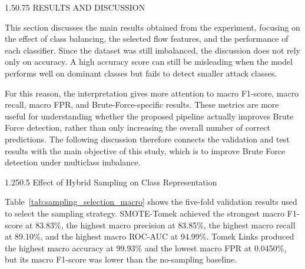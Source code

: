 \documentclass[12pt,a4paper]{article}
\makeatletter
\renewcommand{\section}{\@startsection{section}{1}{0pt}%
  {1.5\baselineskip}{0.75\baselineskip}%
  {\normalfont\fontsize{13}{15.6}\selectfont\bfseries}}
\renewcommand{\subsection}{\@startsection{subsection}{2}{0pt}%
  {1.25\baselineskip}{0.5\baselineskip}%
  {\normalfont\fontsize{13}{15.6}\selectfont\bfseries}}
\makeatother
\begin{document}
\FloatBarrier

\section{RESULTS AND DISCUSSION}

This section discusses the main results obtained from the experiment, focusing on the effect of class balancing, the selected flow features, and the performance of each classifier. Since the dataset was still imbalanced, the discussion does not rely only on accuracy. A high accuracy score can still be misleading when the model performs well on dominant classes but fails to detect smaller attack classes.

For this reason, the interpretation gives more attention to macro F1-score, macro recall, macro FPR, and Brute-Force-specific results. These metrics are more useful for understanding whether the proposed pipeline actually improves Brute Force detection, rather than only increasing the overall number of correct predictions. The following discussion therefore connects the validation and test results with the main objective of this study, which is to improve Brute Force detection under multiclass imbalance.

\subsection{Effect of Hybrid Sampling on Class Representation}

Table~\ref{tab:sampling_selection_macro} shows the five-fold validation results used to select the sampling strategy. SMOTE-Tomek achieved the strongest macro F1-score at 83.83\%, the highest macro precision at 83.85\%, the highest macro recall at 89.10\%, and the highest macro ROC-AUC at 94.99\%. Tomek Links produced the highest macro accuracy at 99.93\% and the lowest macro FPR at 0.0450\%, but its macro F1-score was lower than the no-sampling baseline.

\begin{table}[H]
\caption{Sampling Method Selection Based on Validation Macro Performance}
\label{tab:sampling_selection_macro}
\centering
\scriptsize
\renewcommand{\arraystretch}{1.15}
\setlength{\tabcolsep}{3pt}
\caption*{\textit{Note.} Sampling strategies were evaluated with a Decision Tree classifier across five validation folds.}
\end{table}
\end{document}
